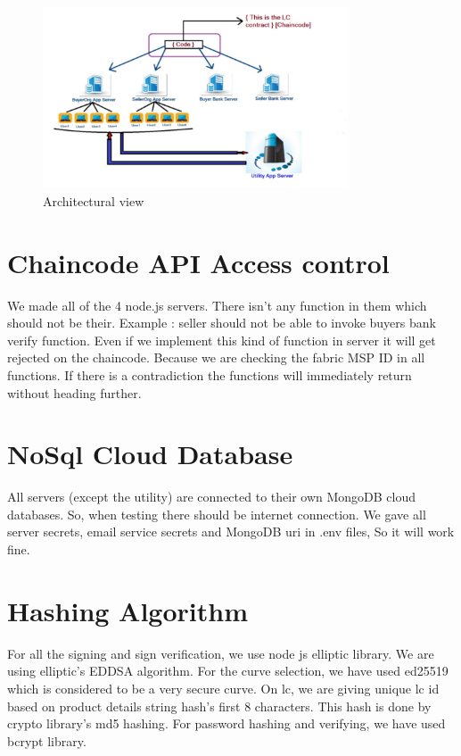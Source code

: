 \documentclass[a4paper,12pt]{report}
\begin{document}
\begin{figure}[h]
    \centering
    \includegraphics[width=0.81\textwidth]{Archi.pdf}
    \caption{Architectural view}
    \label{fig:archi}
\end{figure}

\section{Chaincode API Access control}
We made all of the 4 node.js servers. There isn't any function in them which should not be their. Example : seller should not be able to invoke buyers bank verify function. Even if we implement this kind of function in server it will get rejected on the chaincode. Because we are checking the fabric MSP ID in all functions. If there is a contradiction the functions will immediately return without heading further.
\vspace{10pt}
\section{NoSql Cloud Database}
All servers (except the utility) are connected to their own MongoDB cloud databases. So, when testing there should be internet connection. We gave all server secrets, email service secrets and MongoDB uri in .env files, So it will work fine.
\vspace{10pt}
\section{Hashing Algorithm}
For all the signing and sign verification, we use node js elliptic library. We are using elliptic's EDDSA algorithm\cite{eddsa}. For the curve selection, we have used ed25519\cite{eddsa} which is considered to be a very secure curve. On lc, we are giving unique lc id based on product details string hash's first 8 characters. This hash is done by crypto library's md5 hashing\cite{md5}. For password hashing and verifying, we have used bcrypt library.
\vspace{10pt}
\end{document}
